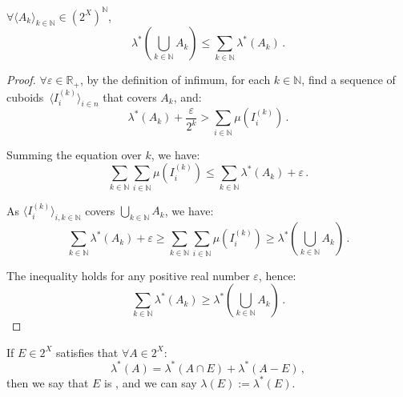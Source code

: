 \documentclass[openany]{book}
\begin{document}
\begin{theorem}
	\label{theorem: countable subadditivity of Lebesgue outer measure}
	$\forall \langle A_k \rangle_{k \in \mathbb N} \in (2^X)^\mathbb N$, 
	\begin{equation*}
		\lambda^* \left( \bigcup_{k \in \mathbb N} A_k \right)
		\leq
		\sum_{k \in \mathbb N} \lambda^*(A_k)\,.
	\end{equation*}
\end{theorem}
\begin{proof}
	$\forall \varepsilon \in \mathbb R_+$, by the definition of infimum, for each $k \in \mathbb N$, find a sequence of cuboids~$\langle I^{(k)}_i \rangle_{i \in n}$ that covers $A_k$, and:
	\begin{equation*}
		\lambda^*(A_k) + \frac{\varepsilon}{2^k} > \sum_{i \in \mathbb N} \mu(I_i^{(k)})\,.
	\end{equation*}

	Summing the equation over $k$, we have:
	\begin{equation*}
		\sum_{k \in \mathbb N} \sum_{i \in \mathbb N} \mu(I_i^{(k)})
		\leq \sum_{k \in \mathbb N} \lambda^*(A_k) + \varepsilon\,.
	\end{equation*}

	As $\langle I^{(k)}_i \rangle_{i, k \in \mathbb N}$ covers $\bigcup_{k \in \mathbb N} A_k$, we have:
	\begin{equation*}
		\sum_{k \in \mathbb N} \lambda^*(A_k) + \varepsilon 
			\geq \sum_{k \in \mathbb N} \sum_{i \in \mathbb N} \mu(I_i^{(k)})
			\geq \lambda^* \left( 
				\bigcup_{k \in \mathbb N} A_k
			 \right)\,.
	\end{equation*}

	The inequality holds for any positive real number $\varepsilon$, hence:
	\begin{equation*}
		\sum_{k \in \mathbb N} \lambda^*(A_k) 
			\geq \lambda^* \left( 
				\bigcup_{k \in \mathbb N} A_k
			 \right)\,.
	\end{equation*}
\end{proof}

\begin{definition}
	If $E \in 2^X$ satisfies that $\forall A \in 2^X$:
	\begin{equation*}
		\lambda^*(A) = \lambda^*(A \cap E) + \lambda^*(A  - E)\,,
	\end{equation*}
	then we say that $E$ is , and we can say $\lambda(E) := \lambda^*(E)$.
\end{definition}
\end{document}
